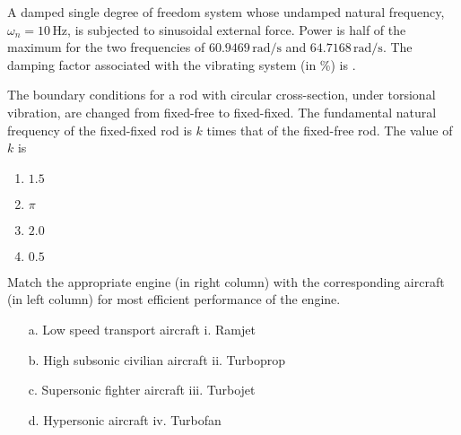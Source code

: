 \iffalse
\title{Assignment5}
\author{ee24btech11064}
\chapter{2014}
\section{ae}
\fi

\item A damped single degree of freedom system whose undamped natural frequency, $\omega_n = 10 \, \text{Hz}$, is subjected to sinusoidal external force. Power is half of the maximum for the two frequencies of $60.9469 \, \text{rad/s}$ and $64.7168 \, \text{rad/s}$. The damping factor associated with the vibrating system (in \%) is \underline{\hspace{4cm}}.
\vspace{0.5cm}
\item The boundary conditions for a rod with circular cross-section, under torsional vibration, are changed from fixed-free to fixed-fixed. The fundamental natural frequency of the fixed-fixed rod is \(k\) times that of the fixed-free rod. The value of \(k\) is
\begin{multicols}{2}
\begin{enumerate}
      \item $1.5$
        \item $\pi$
        \item $2.0$
        \item $0.5$
\end{enumerate}
\end{multicols}
\vspace{0.5cm}
\item Match the appropriate engine (in right column) with the corresponding aircraft (in left column) for most efficient performance of the engine.

\begin{itemize}
    \item[a.] Low speed transport aircraft \hspace{3cm} i. Ramjet
    \item[b.] High subsonic civilian aircraft \hspace{2.8cm} ii. Turboprop
    \item[c.] Supersonic fighter aircraft \hspace{3cm} iii. Turbojet
    \item[d.] Hypersonic aircraft \hspace{4.4cm} iv. Turbofan
\end{itemize}

